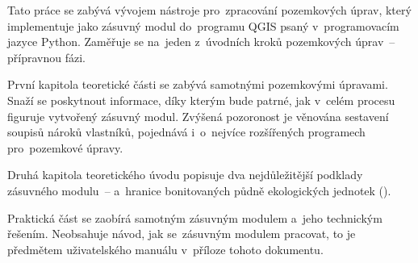 Tato práce se zabývá vývojem nástroje pro~zpracování pozemkových úprav, který implementuje jako zásuvný modul do~programu QGIS psaný v~programovacím jazyce Python. Zaměřuje se na~jeden z~úvodních kroků pozemkových úprav~– přípravnou fázi.

První kapitola teoretické části se zabývá samotnými pozemkovými úpravami. Snaží se poskytnout informace, díky kterým bude patrné, jak v~celém procesu figuruje vytvořený zásuvný modul. Zvýšená pozoronost je věnována sestavení soupisů nároků vlastníků, pojednává i~o~nejvíce rozšířených programech pro~pozemkové úpravy.

Druhá kapitola teoretického úvodu popisuje dva nejdůležitější podklady zásuvného modulu~–  a~hranice bonitovaných půdně ekologických jednotek ().

Praktická část se zaobírá samotným zásuvným modulem a~jeho technickým řešením. Neobsahuje návod, jak se~zásuvným modulem pracovat, to je předmětem uživatelského manuálu v~příloze tohoto dokumentu.
